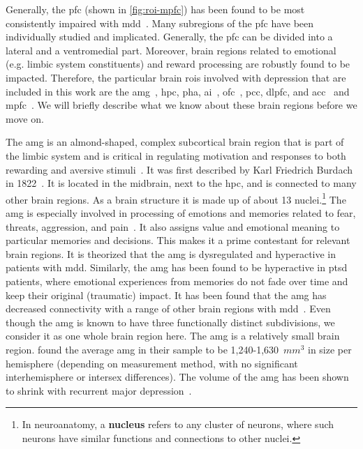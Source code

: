 Generally, the \gls{pfc} (shown in \cref{fig:roi-mpfc}) has been found to be most consistently impaired with \gls{mdd}~\parencite{George1994, Pizzagalli2021}.
Many subregions of the \gls{pfc} have been individually studied and implicated.
Generally, the \gls{pfc} can be divided into a lateral and a ventromedial part.
Moreover, brain regions related to emotional (e.g. limbic system constituents) and reward processing are robustly found to be impacted.
Therefore, the particular brain \glspl{roi} involved with depression that are included in this work are the \gls{amg}~\parencite{Dannlowski2009, Kong2013, Connolly2017, Zhang2020}, \gls{hpc}, \gls{pha}, \gls{ai}~\parencite{Avery2014, Kandilarova2018}, \gls{ofc}~\parencite{Rolls2020}, \gls{pcc}, \gls{dlpfc}, and \gls{acc}~\parencite{Drevets2008} and \gls{mpfc}~\parencite{Pizzagalli2021}.
We will briefly describe what we know about these brain regions before we move on.

The \gls{amg} is an almond-shaped, complex subcortical brain region that is part of the limbic system and is critical in regulating motivation and responses to both rewarding and aversive stimuli~\parencite{Nestler2002}.
It was first described by Karl Friedrich Burdach in 1822~\parencite{Burdach1826}.
It is located in the midbrain, next to the \gls{hpc}, and is connected to many other brain regions.
As a brain structure it is made up of about 13 nuclei.\footnote{In neuroanatomy, a \textbf{nucleus} refers to any cluster of neurons, where such neurons have similar functions and connections to other nuclei.}
The \gls{amg} is especially involved in processing of emotions and memories related to fear, threats, aggression, and pain~\parencite{Thompson2017b}.
It also assigns value and emotional meaning to particular memories and decisions.
This makes it a prime contestant for relevant brain regions.
It is theorized that the \gls{amg} is dysregulated and hyperactive in patients with \gls{mdd}.
Similarly, the \gls{amg} has been found to be hyperactive in \gls{ptsd} patients, where emotional experiences from memories do not fade over time and keep their original (traumatic) impact.
It has been found that the \gls{amg} has decreased connectivity with a range of other brain regions with \gls{mdd}~\parencite{Tang2013, Ramasubbu2014}.
Even though the \gls{amg} is known to have three functionally distinct subdivisions, we consider it as one whole brain region here.
The \gls{amg} is a relatively small brain region.
\textcite{Brabec2010} found the average \gls{amg} in their sample to be 1,240-1,630~$mm^3$ in size per hemisphere (depending on measurement method, with no significant interhemisphere or intersex differences).
The volume of the \gls{amg} has been shown to shrink with recurrent major depression~\parencite{Sheline1998}.


